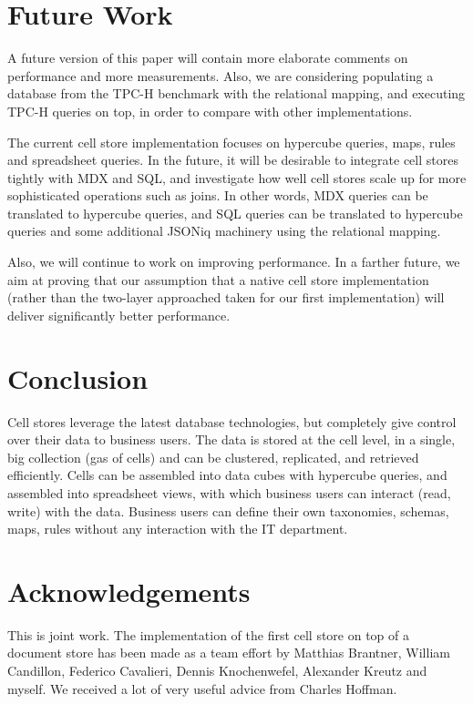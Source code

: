 \documentclass{acm_proc_article-sp}
\begin{document}
\section{Future Work}

A future version of this paper will contain more elaborate comments on performance and more measurements. Also, we are considering populating a database from the TPC-H benchmark with the relational mapping, and executing TPC-H queries on top, in order to compare with other implementations.

The current cell store implementation focuses on hypercube queries, maps, rules and spreadsheet queries. In the future, it will be desirable to integrate cell stores tightly with MDX and SQL, and investigate how well cell stores scale up for more sophisticated operations such as joins. In other words, MDX queries can be translated to hypercube queries, and SQL queries can be translated to hypercube queries and some additional JSONiq machinery using the relational mapping.

Also, we will continue to work on improving performance. In a farther future, we aim at proving that our assumption that a native cell store implementation (rather than the two-layer approached taken for our first implementation) will deliver significantly better performance.

\section{Conclusion}

Cell stores leverage the latest database technologies, but completely give control over their data to business users. The data is stored at the cell level, in a single, big collection (gas of cells) and can be clustered, replicated, and retrieved efficiently. Cells can be assembled into data cubes with hypercube queries, and assembled into spreadsheet views, with which business users can interact (read, write) with the data. Business users can define their own taxonomies, schemas, maps, rules without any interaction with the IT department.

\section{Acknowledgements}

This is joint work. The implementation of the first cell store on top of a document store has been made as a team effort by Matthias Brantner, William Candillon, Federico Cavalieri, Dennis Knochenwefel, Alexander Kreutz and myself. We received a lot of very useful advice from Charles Hoffman.



\end{document}
